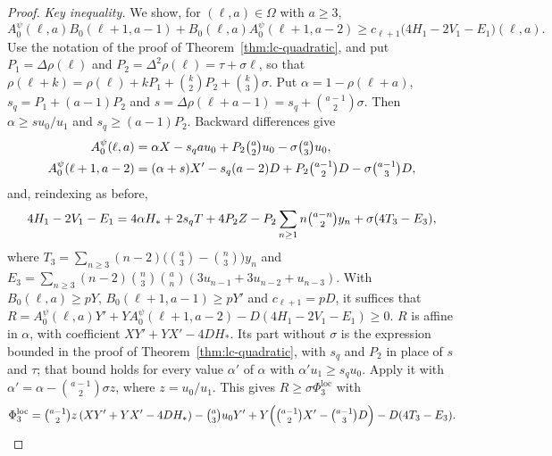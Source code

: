 \begin{proof}
\emph{Key inequality.} We show, for $(\ell,a)\in\Omega$ with $a\geq3$,
\begin{equation}\label{eq:cubic-key}
A^\psi_0(\ell,a)B_0(\ell+1,a-1)+B_0(\ell,a)A^\psi_0(\ell+1,a-2)\geq c_{\ell+1}\bigl(4H_1-2V_1-E_1\bigr)(\ell,a).
\end{equation}
Use the notation of the proof of Theorem~\ref{thm:lc-quadratic}, and put $P_1=\Delta\rho(\ell)$ and $P_2=\Delta^2\rho(\ell)=\tau+\sigma\ell$, so that $\rho(\ell+k)=\rho(\ell)+kP_1+\binom k2P_2+\binom k3\sigma$. Put $\alpha=1-\rho(\ell+a)$, $s_q=P_1+(a-1)P_2$ and $s=\Delta\rho(\ell+a-1)=s_q+\binom{a-1}2\sigma$. Then $\alpha\geq su_0/u_1$ and $s_q\geq(a-1)P_2$. Backward differences give
\[
\begin{aligned}
A^\psi_0(\ell,a)&=\alpha X-s_qau_0+P_2\tbinom a2u_0-\sigma\tbinom a3u_0,\\
A^\psi_0(\ell+1,a-2)&=(\alpha+s)X'-s_q(a-2)D+P_2\tbinom{a-1}2D-\sigma\tbinom{a-1}3D,
\end{aligned}
\]
and, reindexing as before,
\[
4H_1-2V_1-E_1=4\alpha H_*+2s_qT+4P_2Z-P_2\sum_{n\geq1}n\tbinom{a-n}2y_n+\sigma(4T_3-E_3),
\]
where $T_3=\sum_{n\geq3}(n-2)\bigl(\binom a3-\binom n3\bigr)y_n$ and $E_3=\sum_{n\geq3}(n-2)\binom n3\binom an(3u_{n-1}+3u_{n-2}+u_{n-3})$. With $B_0(\ell,a)\geq pY$, $B_0(\ell+1,a-1)\geq pY'$ and $c_{\ell+1}=pD$, it suffices that $R=A^\psi_0(\ell,a)Y'+YA^\psi_0(\ell+1,a-2)-D(4H_1-2V_1-E_1)\geq0$. $R$ is affine in $\alpha$, with coefficient $XY'+YX'-4DH_*$. Its part without $\sigma$ is the expression bounded in the proof of Theorem~\ref{thm:lc-quadratic}, with $s_q$ and $P_2$ in place of $s$ and $\tau$; that bound holds for every value $\alpha'$ of $\alpha$ with $\alpha'u_1\geq s_qu_0$. Apply it with $\alpha'=\alpha-\binom{a-1}2\sigma z$, where $z=u_0/u_1$. This gives $R\geq\sigma\Phi^{\mathrm{loc}}_3$ with
\[
\Phi^{\mathrm{loc}}_3=\tbinom{a-1}2z\,(XY'+YX'-4DH_*)-\tbinom a3u_0Y'+Y\Bigl(\tbinom{a-1}2X'-\tbinom{a-1}3D\Bigr)-D(4T_3-E_3).
\]


\end{proof}
